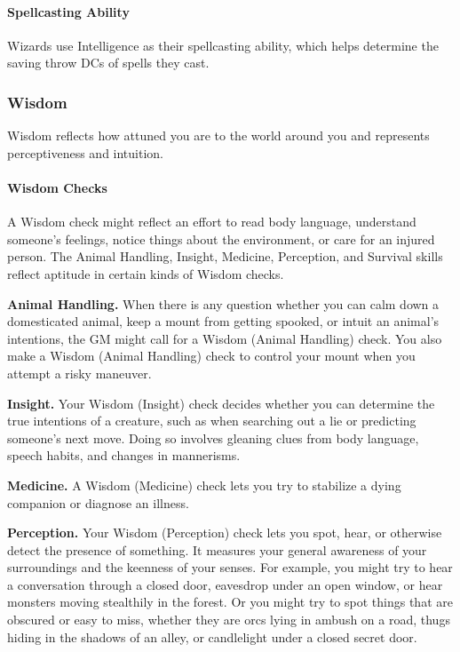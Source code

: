 \documentclass[
]{article}
\begin{document}
\hypertarget{spellcasting-ability}{%
\paragraph{Spellcasting Ability}\label{spellcasting-ability}}

Wizards use Intelligence as their spellcasting ability, which helps
determine the saving throw DCs of spells they cast.

\hypertarget{wisdom-1}{%
\subsubsection{Wisdom}\label{wisdom-1}}

Wisdom reflects how attuned you are to the world around you and
represents perceptiveness and intuition.

\hypertarget{wisdom-checks}{%
\paragraph{Wisdom Checks}\label{wisdom-checks}}

A Wisdom check might reflect an effort to read body language, understand
someone's feelings, notice things about the environment, or care for an
injured person. The Animal Handling, Insight, Medicine, Perception, and
Survival skills reflect aptitude in certain kinds of Wisdom checks.

\textbf{Animal Handling.} When there is any question whether you can
calm down a domesticated animal, keep a mount from getting spooked, or
intuit an animal's intentions, the GM might call for a Wisdom (Animal
Handling) check. You also make a Wisdom (Animal Handling) check to
control your mount when you attempt a risky maneuver.

\textbf{Insight.} Your Wisdom (Insight) check decides whether you can
determine the true intentions of a creature, such as when searching out
a lie or predicting someone's next move. Doing so involves gleaning
clues from body language, speech habits, and changes in mannerisms.

\textbf{Medicine.} A Wisdom (Medicine) check lets you try to stabilize a
dying companion or diagnose an illness.

\textbf{Perception.} Your Wisdom (Perception) check lets you spot, hear,
or otherwise detect the presence of something. It measures your general
awareness of your surroundings and the keenness of your senses. For
example, you might try to hear a conversation through a closed door,
eavesdrop under an open window, or hear monsters moving stealthily in
the forest. Or you might try to spot things that are obscured or easy to
miss, whether they are orcs lying in ambush on a road, thugs hiding in
the shadows of an alley, or candlelight under a closed secret door.
\end{document}
